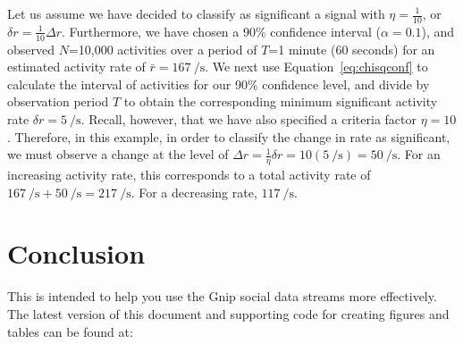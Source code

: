 \documentclass{article}
\begin{document}
%
%


Let us assume we have decided to classify as significant a signal with $\eta = \frac{1}{10}$, or 
$\delta r = \frac{1}{10}\Delta r$. Furthermore, we have chosen a 90\% confidence interval 
($\alpha = 0.1$), and observed $N$=10,000 activities over a period of $T$=1 minute 
(60 seconds) for an estimated activity rate of $\bar r = 167~\si{\per\second}$. We next use 
Equation~\ref{eq:chisqconf} to calculate the interval of activities for our 
90\% confidence level, and divide by observation period $T$ to obtain the corresponding 
minimum significant activity rate $\delta r = 5~\si{\per\second}$. Recall, however, 
that we have also specified a criteria factor $\eta = 10$. Therefore, in this example, 
in order to classify the change in rate as significant, we must observe a change at the 
level of 
$\Delta r =\frac{1}{\eta} \delta r = 10 (5~\si{\per\second}) = 50~\si{\per\second}$. 
For an increasing activity rate, this corresponds to a total activity rate of 
$167~\si{\per\second} + 50~\si{\per\second} = 217~\si{\per\second}$. For a decreasing 
rate, $117~\si{\per\second}$.




\section{Conclusion} 

This is intended to help you use the Gnip social data streams more effectively.  The latest version of this
document and supporting code for creating figures and tables can be found at:
\end{document}
